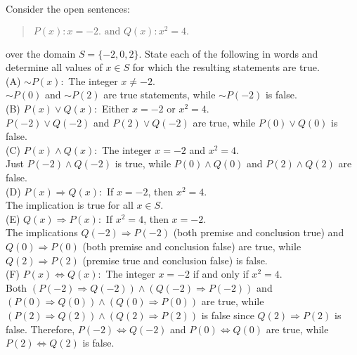 \documentclass[12pt]{article}
\newenvironment{problem}[2][Problem]{\begin{trivlist}
		\item[\hskip \labelsep {\bfseries #1}\hskip \labelsep {\bfseries #2.}]}{\end{trivlist}}
\begin{document}
\begin{problem}{38}
	Consider the open sentences:
	\begin{quote}
		\centering
		$P(x): x = -2. \text{ and } Q(x): x^{2} = 4.$
	\end{quote}
	over the domain $S = \{-2, 0, 2\}.$ State each of the following in words and determine all values of $x \in S$ for which the resulting statements are true.\\
	
	(A) $\sim P(x): $ The integer $x \neq -2$.\\ 
	$\sim P(0)$ and $\sim P(2)$ are true statements, while $\sim P(-2)$ is false.\\
	
	(B) $P(x) \vee Q(x): $ Either $x = -2$ or $x^{2} = 4.$\\
	$P(-2)\vee Q(-2)$ and $P(2)\vee Q(-2)$ are true, while $P(0)\vee Q(0)$ is false.\\
	
	(C) $P(x)\wedge Q(x):$ The integer $x = -2$ and $x^{2} = 4.$\\ 
	Just $P(-2)\wedge Q(-2)$ is true, while $P(0)\wedge Q(0)$ and $P(2)\wedge Q(2)$ are false.\\
	
	(D) $P(x) \Rightarrow Q(x): $ If $x = -2$, then $x^{2} = 4$.\\
	The implication is true for all $x \in S$.\\
	
	(E) $Q(x) \Rightarrow P(x):$ If $x^{2} = 4$, then $x = -2$.\\
	The implications $Q(-2) \Rightarrow P(-2)$ (both premise and conclusion true) and $Q(0) \Rightarrow P(0)$ (both premise and conclusion false) are true, while $Q(2) \Rightarrow P(2)$ (premise true and conclusion false) is false.\\
	
	(F) $P(x) \Leftrightarrow Q(x): $ The integer $x = -2$ if and only if $x^{2} = 4.$\\
	Both $(P(-2)\Rightarrow Q(-2))\wedge (Q(-2)\Rightarrow P(-2))$ and $(P(0)\Rightarrow Q(0))\wedge (Q(0)\Rightarrow P(0))$ are true, while $(P(2)\Rightarrow Q(2))\wedge (Q(2)\Rightarrow P(2))$ is false since $Q(2)\Rightarrow P(2)$ is false. Therefore, $P(-2) \Leftrightarrow Q(-2)$ and $P(0) \Leftrightarrow Q(0)$ are true, while $P(2) \Leftrightarrow Q(2) $ is false.
	
\end{problem}
\end{document}
